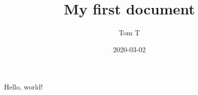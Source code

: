 \documentclass{article}
\title{My first document}
\date{2020-03-02}
\author{Tom T}
\begin{document}
    \maketitle
    \newpage
    
    Hello, world!
\end{document}
